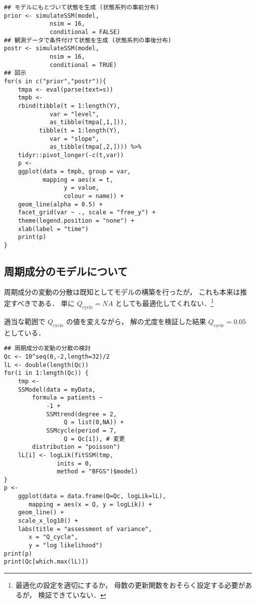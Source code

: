 \documentclass[10pt,oneside,fleqn]{scrartcl}
\begin{document}
\begin{figure*}[htbp]
  \centering
\end{figure*}

\begin{verbatim}
## モデルにもとづいて状態を生成 (状態系列の事前分布)
prior <- simulateSSM(model,
		     nsim = 16,
		     conditional = FALSE)
## 観測データで条件付けて状態を生成 (状態系列の事後分布)
postr <- simulateSSM(model,
		     nsim = 16,
		     conditional = TRUE)
## 図示
for(s in c("prior","postr")){
    tmpa <- eval(parse(text=s))
    tmpb <- 
	rbind(tibble(t = 1:length(Y),
		     var = "level",
		     as_tibble(tmpa[,1,])),
	      tibble(t = 1:length(Y),
		     var = "slope",
		     as_tibble(tmpa[,2,]))) %>%
	tidyr::pivot_longer(-c(t,var)) 
    p <- 
	ggplot(data = tmpb, group = var,
	       mapping = aes(x = t,
			     y = value,
			     colour = name)) +
	geom_line(alpha = 0.5) +
	facet_grid(var ~ ., scale = "free_y") +
	theme(legend.position = "none") +
	xlab(label = "time")
    print(p)
}
\end{verbatim}

\subsection{周期成分のモデルについて}
\label{sec:org5599df3}

周期成分の変動の分散は既知としてモデルの構築を行ったが，
これも本来は推定すべきである．
単に \(Q_{\mathrm{cycle}}=NA\)
としても最適化してくれない．\footnote{最適化の設定を適切にするか，
母数の更新関数をおそらく設定する必要があるが，
検証できていない．}

適当な範囲で \(Q_{\mathrm{cycle}}\) の値を変えながら，
解の尤度を検証した結果 \(Q_{\mathrm{cycle}}=0.05\) としている．

\begin{figure}[htbp]
  \centering
  \myGraph*{}
\end{figure}

\begin{verbatim}
## 周期成分の変動の分散の検討
Qc <- 10^seq(0,-2,length=32)/2
lL <- double(length(Qc))
for(i in 1:length(Qc)) {
    tmp <-
	SSModel(data = myData, 
		formula = patients ~ 
		    -1 + 
		    SSMtrend(degree = 2, 
			     Q = list(0,NA)) +
		    SSMcycle(period = 7, 
			     Q = Qc[i]), # 変更
		distribution = "poisson") 
    lL[i] <- logLik(fitSSM(tmp,
			   inits = 0,
			   method = "BFGS")$model)
}
p <-
    ggplot(data = data.frame(Q=Qc, logLik=lL),
	   mapping = aes(x = Q, y = logLik)) +
    geom_line() +
    scale_x_log10() +
    labs(title = "assessment of variance",
       x = "Q_cycle",
       y = "log likelihood")
print(p)
print(Qc[which.max(lL)])
\end{verbatim}
\end{document}
